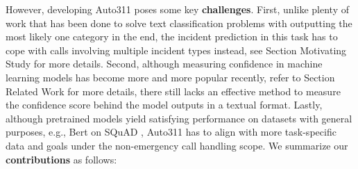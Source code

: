 
However, developing Auto311 poses some key \textbf{challenges}. First, unlike plenty of work that has been done to solve text classification problems \cite{kowsari2019text, mironczuk2018recent, minaee2021deep, aggarwal2012survey} with outputting the most likely one category in the end, the incident prediction in this task has to cope with calls involving multiple incident types instead, see Section Motivating Study for more details. Second, although measuring confidence in machine learning models has become more and more popular recently, refer to Section Related Work for more details, there still lacks an effective method to measure the confidence score behind the model outputs in a textual format. Lastly, although pretrained models yield satisfying performance on datasets with general purposes, e.g., Bert \cite{devlin2018bert} on SQuAD \cite{rajpurkar2016squad}, Auto311 has to align with more task-specific data and goals under the non-emergency call handling scope. We summarize our \textbf{contributions} as follows:
